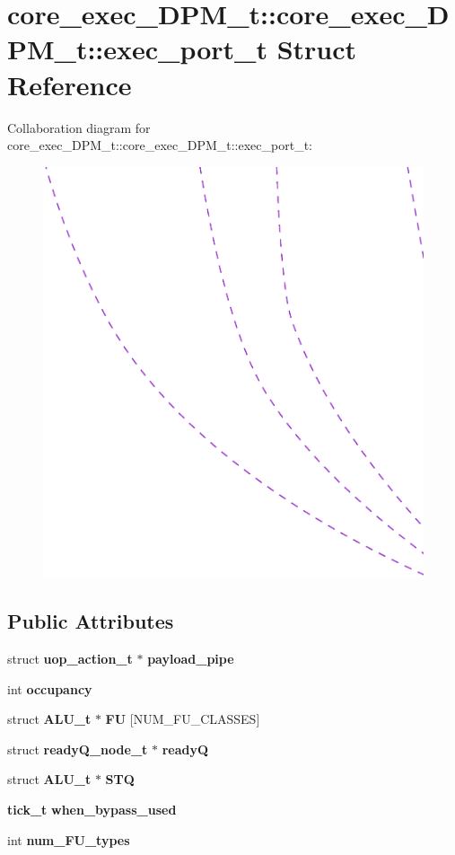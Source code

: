 \section{core\_\-exec\_\-DPM\_\-t::core\_\-exec\_\-DPM\_\-t::exec\_\-port\_\-t Struct Reference}
\label{structcore__exec__DPM__t_1_1exec__port__t}
Collaboration diagram for core\_\-exec\_\-DPM\_\-t::core\_\-exec\_\-DPM\_\-t::exec\_\-port\_\-t:\nopagebreak
\begin{figure}[H]
\begin{center}
\leavevmode
\includegraphics[width=400pt]{structcore__exec__DPM__t_1_1exec__port__t__coll__graph}
\end{center}
\end{figure}
\subsection*{Public Attributes}
\begin{CompactItemize}
\item 
struct {\bf uop\_\-action\_\-t} $\ast$ {\bf payload\_\-pipe}
\item 
int {\bf occupancy}
\item 
struct {\bf ALU\_\-t} $\ast$ {\bf FU} [NUM\_\-FU\_\-CLASSES]
\item 
struct {\bf readyQ\_\-node\_\-t} $\ast$ {\bf readyQ}
\item 
struct {\bf ALU\_\-t} $\ast$ {\bf STQ}
\item 
{\bf tick\_\-t} {\bf when\_\-bypass\_\-used}
\item 
int {\bf num\_\-FU\_\-types}
\end{CompactItemize}


